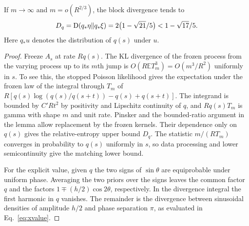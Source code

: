 \begin{corollary}\label{cor:subcritical}
If $m\to\infty$ and $m=o(R^{2/3})$, the block divergence tends to
\[
 D_q=\mathrm D(q_*\eta\|q_*\xi)=2\big(1-\sqrt{21}/5\big)<1-\sqrt{17}/5 .
\]
Here $q_*u$ denotes the distribution of $q(s)$ under $u$.
\end{corollary}
\begin{proof}
Freeze $A_s$ at rate $Rq(s)$. The KL divergence of the frozen process from the varying process up to its $m$th jump is $O(R\mathbb E T_m^3)=O(m^3/R^2)$ uniformly in $s$. To see this, the stopped Poisson likelihood gives the expectation under the frozen law of the integral through $T_m$ of $R[q(s)\log(q(s)/q(s+t))-q(s)+q(s+t)]$. The integrand is bounded by $C'Rt^2$ by positivity and Lipschitz continuity of $q$, and $Rq(s)T_m$ is gamma with shape $m$ and unit rate. Pinsker and the bounded-ratio argument in the lemma allow replacement by the frozen kernels. Their dependence only on $q(s)$ gives the relative-entropy upper bound $D_q$. The statistic $m/(R T_m)$ converges in probability to $q(s)$ uniformly in $s$, so data processing and lower semicontinuity give the matching lower bound.

For the explicit value, given $q$ the two signs of $\sin\theta$ are equiprobable under uniform phase. Averaging the two priors over the signs leaves the common factor $q$ and the factors $1\mp(h/2)\cos 2\theta$, respectively. In the divergence integral the first harmonic in $q$ vanishes. The remainder is the divergence between sinusoidal densities of amplitude $h/2$ and phase separation $\pi$, as evaluated in Eq.~\eqref{eq:xvalue}.
\end{proof}
